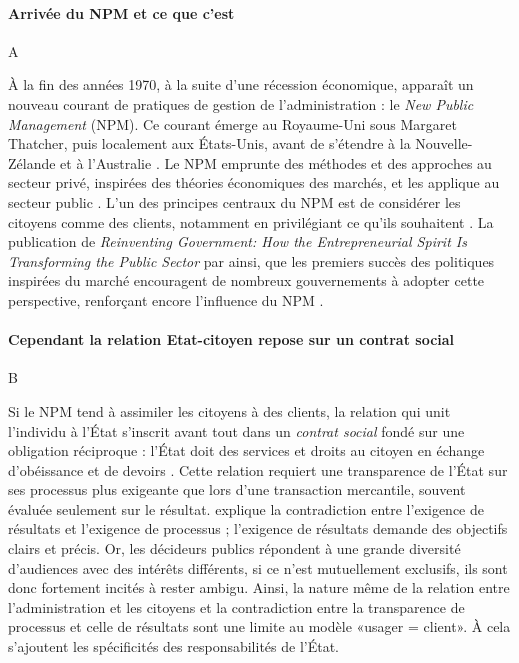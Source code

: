 \documentclass[a4paper,12pt, openany]{book}
\begin{document}

\paragraph{Arrivée du NPM et ce que c'est} A

À la fin des années 1970, à la suite d’une récession économique, apparaît un nouveau courant de pratiques de gestion de l’administration : le \textit{New Public Management} (NPM). Ce courant émerge au Royaume-Uni sous Margaret Thatcher, puis localement aux États-Unis, avant de s’étendre à la Nouvelle-Zélande et à l’Australie \parencite{gruening01}. Le NPM emprunte des méthodes et des approches au secteur privé, inspirées des théories économiques des marchés, et les applique au secteur public \parencite{pollitt11}. L’un des principes centraux du NPM est de considérer les citoyens comme des clients, notamment en privilégiant ce qu’ils souhaitent \parencite{aberbach05}. La publication de \textit{Reinventing Government: How the Entrepreneurial Spirit Is Transforming the Public Sector} par \textcite{osborne92} \parencite{thomas13} ainsi, que les premiers succès des politiques inspirées du marché \parencite{bashevkin94} encouragent de nombreux gouvernements à adopter cette perspective, renforçant encore l’influence du NPM \parencite{haque98, kaul96}. \par


\paragraph{Cependant la relation Etat-citoyen repose sur un contrat social} B

Si le NPM tend à assimiler les citoyens à des clients, la relation qui unit l’individu à l’État s’inscrit avant tout dans un \textit{contrat social} fondé sur une obligation réciproque : l'État doit des services et droits au citoyen en échange d'obéissance et de devoirs \parencite{haque99b}. Cette relation requiert une transparence de l'État sur ses processus plus exigeante que lors d'une transaction mercantile, souvent évaluée seulement sur le résultat. \textcite{behn98} explique la contradiction entre l'exigence de résultats et l'exigence de processus ; l'exigence de résultats demande des objectifs clairs et précis. Or, les décideurs publics répondent à une grande diversité d'audiences avec des intérêts différents, si ce n'est mutuellement exclusifs, ils sont donc fortement incités à rester ambigu. Ainsi, la nature même de la relation entre l'administration et les citoyens et la contradiction entre la transparence de processus et celle de résultats sont une limite au modèle «\;usager = client\;». À cela s'ajoutent les spécificités des responsabilités de l'État. \par
\end{document}
